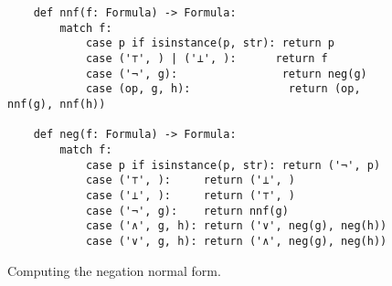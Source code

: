 \begin{figure}[!ht]
  \centering
\begin{verbatim}
    def nnf(f: Formula) -> Formula:
        match f:
            case p if isinstance(p, str): return p
            case ('⊤', ) | ('⊥', ):      return f
            case ('¬', g):                return neg(g)
            case (op, g, h):               return (op, nnf(g), nnf(h))

    def neg(f: Formula) -> Formula:
        match f:
            case p if isinstance(p, str): return ('¬', p)
            case ('⊤', ):     return ('⊥', )
            case ('⊥', ):     return ('⊤', )
            case ('¬', g):    return nnf(g)
            case ('∧', g, h): return ('∨', neg(g), neg(h))
            case ('∨', g, h): return ('∧', neg(g), neg(h))
\end{verbatim}
\vspace*{-0.3cm}
  \caption{Computing the negation normal form.}
  \label{fig:nnf}
\end{figure}

